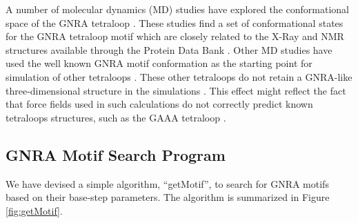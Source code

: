 A  number  of  molecular  dynamics  (MD)  studies  have  explored  the
conformational   space  of   the  GNRA   tetraloop  \cite{cornell1995,
  sorin2002, spackova2010,  depaul2010}. These  studies find a  set of
conformational states  for the GNRA tetraloop motif  which are closely
related to the X-Ray and  NMR structures available through the Protein
Data Bank  \cite{depaul2010, sorin2002}.   Other MD studies  have used
the  well known  GNRA motif  conformation  as the  starting point  for
simulation  of other  tetraloops  \cite{srinivasan1998}.  These  other
tetraloops do  not retain  a GNRA-like three-dimensional  structure in
the simulations  \cite{srinivasan1998}. This effect  might reflect the
fact that force fields used in such calculations \cite{cornell1995} do
not correctly  predict known tetraloops  structures, such as  the GAAA
tetraloop \cite{spackova2010}.

\subsection{GNRA Motif Search Program}
We have devised  a simple algorithm, ``getMotif'', to  search for GNRA
motifs  based  on  their  base-step  parameters.   The  algorithm  is
summarized in Figure \ref{fig:getMotif}.

